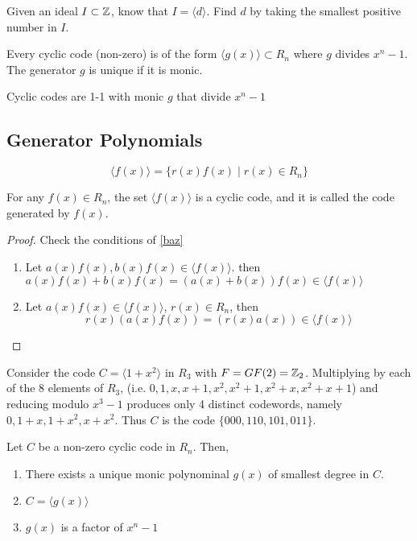 \documentclass{article}
\begin{document}
\begin{example}
  Given an ideal \( I \subset \mathbb{Z} \), know that \( I = \langle d
  \rangle  \). Find \( d \) by taking the smallest positive number in \( I \).
\end{example}
\begin{theorem}
  Every cyclic code (non-zero) is of the form \( \langle g(x) \rangle
  \subset R_n \) where \( g \) divides \( x^n-1 \). The generator \(
  g \) is unique if it is monic.
\end{theorem}
\begin{corollary}
  Cyclic codes are 1-1 with monic \( g \) that divide \( x^n-1  \)
\end{corollary}

\subsection{Generator Polynomials}
\begin{definition}
  \[
    \langle f(x) \rangle = \{r(x)f(x) \mid r(x) \in R_n\}
  \]
\end{definition}
\begin{theorem}
  For any \( f(x) \in R_n \), the set \( \langle f(x) \rangle \) is a cyclic code,
  and it is called the code generated by \( f(x) \).
\end{theorem}
\begin{proof}
  Check the conditions of \autoref{baz}
  \begin{enumerate}
    \item Let \( a(x)f(x), b(x)f(x) \in \langle f(x) \rangle \). then \( a(x)f(x) + b(x)f(x) = (a(x)+b(x))f(x) \in \langle f(x) \rangle  \)
    \item Let \( a(x)f(x) \in \langle f(x) \rangle\), \( r(x) \in R_n \), then \[
        r(x)(a(x)f(x)) = (r(x)a(x)) \in \langle f(x) \rangle
      \]
  \end{enumerate}
\end{proof}
\begin{example}
  Consider the code \( C = \langle 1 + x^2 \rangle \) in \( R_3 \)
  with \( F = GF(2) =\mathbb{Z}_2\). Multiplying by each of the 8 elements of \(
  R_3 \), (i.e. \( 0, 1, x, x+1, x^2, x^2+1, x^2 + x, x^2+x+1 \)) and reducing modulo \( x^3-1 \) produces only 4 distinct
  codewords, namely \( 0, 1+x, 1+x^2, x+x^2 \). Thus \( C \) is the
  code \( \{000, 110, 101, 011\} \).
\end{example}
\begin{theorem}\label{bar}
  Let \( C  \) be a non-zero cyclic code in \( R_n \). Then,
  \begin{enumerate}
    \item There exists a unique monic polynominal \( g(x)\) of
      smallest degree in \( C \).
    \item \( C = \langle g(x) \rangle  \)
    \item \( g(x) \) is a factor of \( x^n-1 \)
  \end{enumerate}
\end{theorem}
\end{document}
